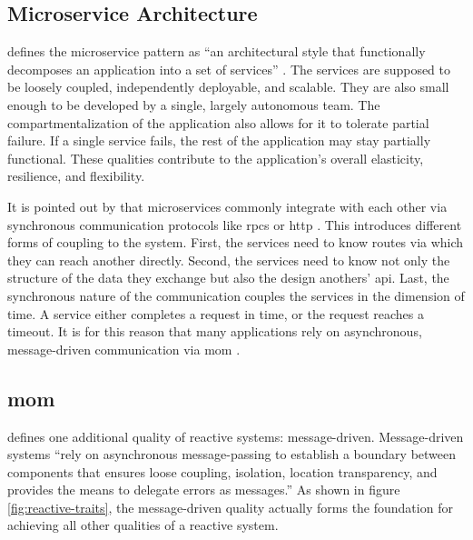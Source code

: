 \subsection{Microservice Architecture}

\citeauthor{richardson_microservices_2019} defines the microservice pattern as \enquote{an architectural style that functionally decomposes an application into a set of services} \parencite[11]{richardson_microservices_2019}.
The services are supposed to be loosely coupled, independently deployable, and scalable.
They are also small enough to be developed by a single, largely autonomous team.
The compartmentalization of the application also allows for it to tolerate partial failure.
If a single service fails, the rest of the application may stay partially functional.
\parencite[14f.]{richardson_microservices_2019}
These qualities contribute to the application's overall elasticity, resilience, and flexibility.

It is pointed out by \citeauthor{fowler_microservices_2014} that microservices commonly integrate with each other via synchronous communication protocols like \glspl{rpc} or \acrshort{http} \parencite{fowler_microservices_2014}.
This introduces different forms of coupling to the system.
First, the services need to know routes via which they can reach another directly.
Second, the services need to know not only the structure of the data they exchange but also the design anothers' \gls{api}.
Last, the synchronous nature of the communication couples the services in the dimension of time.
A service either completes a request in time, or the request reaches a timeout.
It is for this reason that many applications rely on asynchronous, message-driven communication via \gls{mom} \parencite{fowler_microservices_2014}.

\subsection{\acrlong{mom}}

\cite{boner_reactive_2014} defines one additional quality of reactive systems: message-driven.
Message-driven systems \enquote{rely on asynchronous message-passing to
establish a boundary between components that ensures loose coupling, isolation,
location transparency, and provides the means to delegate errors as messages.} \parencite{boner_reactive_2014}
As shown in figure \ref{fig:reactive-traits}, the message-driven quality actually forms the foundation for achieving all other qualities of a reactive system.

